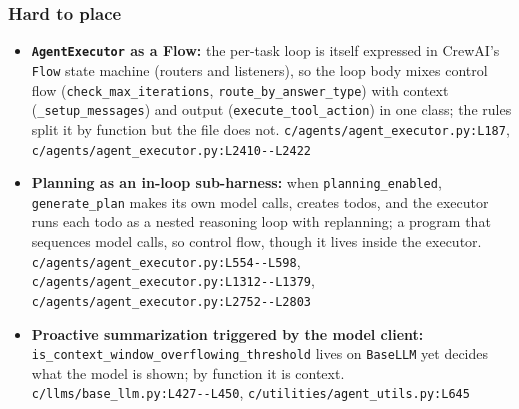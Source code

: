 \subsubsection*{Hard to place}
\begin{itemize}
\item \textbf{\texttt{AgentExecutor} as a Flow:} the per-task loop is itself expressed in CrewAI's \texttt{Flow} state machine (routers and listeners), so the loop body mixes control flow (\texttt{check\_\allowbreak{}max\_\allowbreak{}iterations}, \texttt{route\_\allowbreak{}by\_\allowbreak{}answer\_\allowbreak{}type}) with context (\texttt{\_\allowbreak{}setup\_\allowbreak{}messages}) and output (\texttt{execute\_\allowbreak{}tool\_\allowbreak{}action}) in one class; the rules split it by function but the file does not. \texttt{c/\allowbreak{}agents/\allowbreak{}agent\_\allowbreak{}executor.\allowbreak{}py:\allowbreak{}L187}, \texttt{c/\allowbreak{}agents/\allowbreak{}agent\_\allowbreak{}executor.\allowbreak{}py:\allowbreak{}L2410-\allowbreak{}-\allowbreak{}L2422}
\item \textbf{Planning as an in-loop sub-harness:} when \texttt{planning\_\allowbreak{}enabled}, \texttt{generate\_\allowbreak{}plan} makes its own model calls, creates todos, and the executor runs each todo as a nested reasoning loop with replanning; a program that sequences model calls, so control flow, though it lives inside the executor. \texttt{c/\allowbreak{}agents/\allowbreak{}agent\_\allowbreak{}executor.\allowbreak{}py:\allowbreak{}L554-\allowbreak{}-\allowbreak{}L598}, \texttt{c/\allowbreak{}agents/\allowbreak{}agent\_\allowbreak{}executor.\allowbreak{}py:\allowbreak{}L1312-\allowbreak{}-\allowbreak{}L1379}, \texttt{c/\allowbreak{}agents/\allowbreak{}agent\_\allowbreak{}executor.\allowbreak{}py:\allowbreak{}L2752-\allowbreak{}-\allowbreak{}L2803}
\item \textbf{Proactive summarization triggered by the model client:} \texttt{is\_\allowbreak{}context\_\allowbreak{}window\_\allowbreak{}overflowing\_\allowbreak{}threshold} lives on \texttt{BaseLLM} yet decides what the model is shown; by function it is context. \texttt{c/\allowbreak{}llms/\allowbreak{}base\_\allowbreak{}llm.\allowbreak{}py:\allowbreak{}L427-\allowbreak{}-\allowbreak{}L450}, \texttt{c/\allowbreak{}utilities/\allowbreak{}agent\_\allowbreak{}utils.\allowbreak{}py:\allowbreak{}L645}
\end{itemize}

